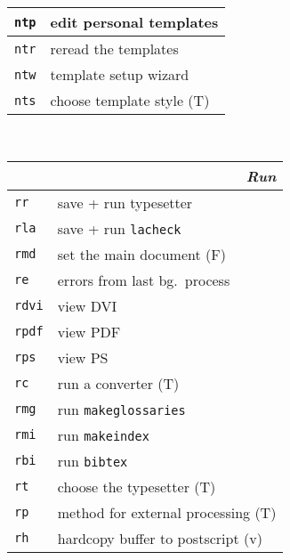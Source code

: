 \documentclass[oneside,10pt,landscape,DIV16]{scrartcl}
\newcommand{\Map}[1] {\textbf{\textasciiacute}\texttt{#1}}
\begin{document}
\begin{multicols}{3}
\begin{center}
\begin{tabular}[]{|p{11mm}|p{60mm}|}
\hline \Map{ntp} & edit personal templates   \\
\hline \Map{ntr} & reread the templates      \\
\hline \Map{ntw} & template setup wizard     \\
\hline \Map{nts} & choose template style     \hfill (T)\\
\hline
%
\end{tabular}\\
%
\begin{tabular}[]{|p{11mm}|p{62mm}|}
\hline
\multicolumn{2}{|r|}{\textsl{\textbf{R}un}} \\[1.0ex]
\hline \Map{rr}   & save + run typesetter                    \\
\hline \Map{rla}  & save + run \texttt{lacheck}              \\
\hline \Map{rmd}  & set the main document                    \hfill (F)\\
\hline \Map{re}   & errors from last bg.\ process            \\
\hline \Map{rdvi} & view DVI                                 \\
\hline \Map{rpdf} & view PDF                                 \\
\hline \Map{rps}  & view PS                                  \\
\hline \Map{rc}   & run a converter                          \hfill (T)\\
\hline
\hline \Map{rmg}  & run \texttt{makeglossaries}              \\
\hline \Map{rmi}  & run \texttt{makeindex}                   \\
\hline \Map{rbi}  & run \texttt{bibtex}                      \\
\hline
\hline \Map{rt}   & choose the typesetter                    \hfill (T)\\
\hline \Map{rp}   & method for external processing           \hfill (T)\\
\hline
\hline \Map{rh}   & hardcopy buffer to postscript            \hfill (v)\\

\end{tabular}
\end{center}
\end{multicols}
\end{document}
